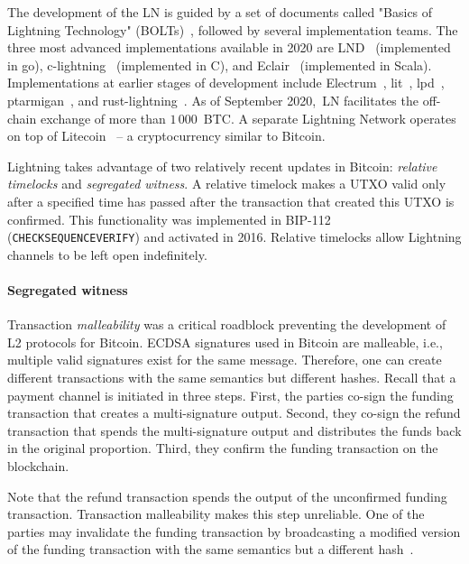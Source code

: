 The development of the LN is guided by a set of documents called "Basics of Lightning Technology" (BOLTs)~\cite{BOLT}, followed by several implementation teams.
The three most advanced implementations available in 2020 are LND~\cite{LND} (implemented in go), c-lightning~\cite{clightning} (implemented in C), and Eclair~\cite{Eclair} (implemented in Scala).
Implementations at earlier stages of development include Electrum~\cite{ElectrumWebsite, ElectrumLightningAnnounce}, lit~\cite{lit}, lpd~\cite{lpd}, ptarmigan~\cite{ptarmigan}, and rust-lightning~\cite{rustlightning}.
As of September 2020,~LN facilitates the off-chain exchange of more than $1\,000$~BTC\@.
A separate Lightning Network operates on top of Litecoin~\cite{1MLLitecoin} -- a cryptocurrency similar to Bitcoin.

Lightning takes advantage of two relatively recent updates in Bitcoin: \textit{relative timelocks} and \textit{segregated witness}.
A relative timelock makes a UTXO valid only after a specified time has passed after the transaction that created this UTXO is confirmed.
This functionality was implemented in BIP-112~\cite{BtcDrak2015} (\texttt{CHECKSEQUENCEVERIFY}) and activated in 2016.
Relative timelocks allow Lightning channels to be left open indefinitely.


\paragraph{Segregated witness}

Transaction \textit{malleability} was a critical roadblock preventing the development of L2 protocols for Bitcoin.
ECDSA signatures used in Bitcoin are malleable, i.e., multiple valid signatures exist for the same message.
Therefore, one can create different transactions with the same semantics but different hashes.
Recall that a payment channel is initiated in three steps.
First, the parties co-sign the funding transaction that creates a multi-signature output.
Second, they co-sign the refund transaction that spends the multi-signature output and distributes the funds back in the original proportion.
Third, they confirm the funding transaction on the blockchain.

Note that the refund transaction spends the output of the unconfirmed funding transaction.
Transaction malleability makes this step unreliable.
One of the parties may invalidate the funding transaction by broadcasting a modified version of the funding transaction with the same semantics but a different hash~\cite{Harding2016}.

